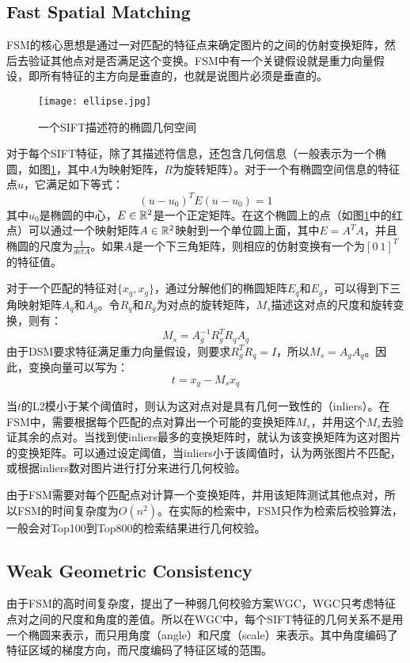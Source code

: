 \subsection{Fast Spatial Matching}
FSM\cite{philbin2007object}的核心思想是通过一对匹配的特征点来确定图片的之间的仿射变换矩阵，然后去验证其他点对是否满足这个变换。FSM中有一个关键假设就是重力向量假设\cite{perd2009efficient}，即所有特征的主方向是垂直的，也就是说图片必须是垂直的。
\begin{figure}[h]
	\centering
	\texttt{[image: ellipse.jpg]}
	\caption{一个SIFT描述符的椭圆几何空间}\label{fig:ellipse}
\end{figure}


对于每个SIFT特征，除了其描述符信息，还包含几何信息（一般表示为一个椭圆，如图\ref{fig:ellipse}，其中$A$为映射矩阵，$R$为旋转矩阵）。对于一个有椭圆空间信息的特征点$u$，它满足如下等式：
\begin{equation}
(u-u_0)^TE(u-u_0)=1
\end{equation}
其中$u_0$是椭圆的中心，$E\in \mathbb{R}^{2 \time 2}$是一个正定矩阵。在这个椭圆上的点（如图\ref{fig:ellipse}中的红点）可以通过一个映射矩阵$A\in\mathbb{R}^{2 \time 2}$映射到一个单位圆上面，其中$E=A^TA$，并且椭圆的尺度为$\frac{1}{det A}$。如果$A$是一个下三角矩阵，则相应的仿射变换有一个为$[0 ~1]^T$的特征值。

对于一个匹配的特征对$\{x_q,x_g\}$，通过分解他们的椭圆矩阵$E_q$和$E_g$，可以得到下三角映射矩阵$A_q$和$A_g$。令$R_q$和$R_g$为对点的旋转矩阵，$M_s$描述这对点的尺度和旋转变换，则有：
\begin{equation}
M_s=A_g^{-1}R_g^TR_qA_q
\end{equation}
由于DSM要求特征满足重力向量假设，则要求$R_g^TR_q=I$\cite{perd2009efficient}，所以$M_s=A_gA_q$。因此，变换向量可以写为：
\begin{equation}
t=x_g-M_sx_q
\end{equation}

当$t$的L2模小于某个阈值时，则认为这对点对是具有几何一致性的（inliers）。在FSM中，需要根据每个匹配的点对算出一个可能的变换矩阵$M_s$，并用这个$M_s$去验证其余的点对。当找到使inliers最多的变换矩阵时，就认为该变换矩阵为这对图片的变换矩阵。可以通过设定阈值，当inliers小于该阈值时，认为两张图片不匹配，或根据inliers数对图片进行打分来进行几何校验。

由于FSM需要对每个匹配点对计算一个变换矩阵，并用该矩阵测试其他点对，所以FSM的时间复杂度为$O(n^2)$。在实际的检索中，FSM只作为检索后校验算法，一般会对Top100到Top800的检索结果进行几何校验。

\subsection{Weak Geometric Consistency}
由于FSM的高时间复杂度，\cite{jegou2008hamming}提出了一种弱几何校验方案WGC，WGC只考虑特征点对之间的尺度和角度的差值。所以在WGC中，每个SIFT特征的几何关系不是用一个椭圆来表示，而只用角度（angle）和尺度（scale）来表示。其中角度编码了特征区域的梯度方向，而尺度编码了特征区域的范围。

